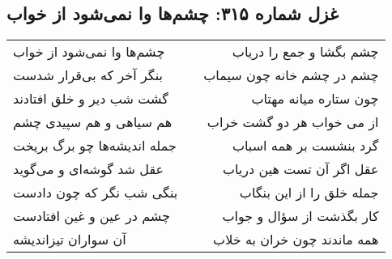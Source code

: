 \begin{center}
\section*{غزل شماره ۳۱۵: چشم‌ها وا نمی‌شود از خواب}
\label{sec:0315}
\begin{longtable}{l p{0.5cm} r}
چشم‌ها وا نمی‌شود از خواب
&&
چشم بگشا و جمع را دریاب
\\
بنگر آخر که بی‌قرار شدست
&&
چشم در چشم خانه چون سیماب
\\
گشت شب دیر و خلق افتادند
&&
چون ستاره میانه مهتاب
\\
هم سیاهی و هم سپیدی چشم
&&
از می خواب هر دو گشت خراب
\\
جمله اندیشه‌ها چو برگ بریخت
&&
گرد بنشست بر همه اسباب
\\
عقل شد گوشه‌ای و می‌گوید
&&
عقل اگر آن تست هین دریاب
\\
بنگی شب نگر که چون دادست
&&
جمله خلق را از این بنگاب
\\
چشم در عین و غین افتادست
&&
کار بگذشت از سؤال و جواب
\\
آن سواران تیزاندیشه
&&
همه ماندند چون خران به خلاب
\\
\end{longtable}
\end{center}
